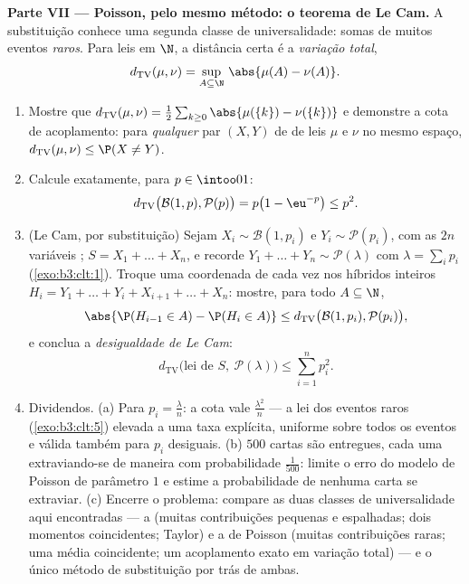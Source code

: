\begin{problem}
\medskip
\noindent\textbf{Parte VII --- Poisson, pelo mesmo método: o teorema de
Le Cam.} A substituição conhece uma segunda classe de universalidade:
somas de muitos eventos  \emph{raros}. Para leis em
$\N$, a distância certa é a \emph{variação total},
\[
d_{\mathrm{TV}}(\mu, \nu) = \sup_{A\subseteq\N}\,
\abs{\mu(A) - \nu(A)} .
\]
\begin{enumerate}[resume]
  \item Mostre que $d_{\mathrm{TV}}(\mu, \nu) =
        \frac12\sum_{k\geq0}\abs{\mu(\{k\}) -
        \nu(\{k\})}$ e demonstre a cota de acoplamento: para
        \emph{qualquer} par $(X, Y)$ de  de leis
        $\mu$ e $\nu$ no mesmo espaço, $d_{\mathrm{TV}}(\mu, \nu) \leq \P(X \neq Y)$.
  \item Calcule exatamente, para $p \in \intoo01$:
        \[
        d_{\mathrm{TV}}\bigl(\mathcal B(1, p), \mathcal
        P(p)\bigr) = p\bigl(1 - \eu^{-p}\bigr) \leq p^2 .
        \]
  \item (Le Cam, por substituição) Sejam $X_i \sim \mathcal B(1,
        p_i)$ e $Y_i \sim \mathcal P(p_i)$, com as $2n$
        variáveis ; $S = X_1 + \dots + X_n$, e recorde $Y_1 + \dots + Y_n \sim \mathcal P(\lambda)$ com $\lambda = \sum_ip_i$
        (\cref{exo:b3:clt:1}). Troque uma coordenada de cada vez nos híbridos
        inteiros $H_i = Y_1 + \dots + Y_i + X_{i+1} + \dots
        + X_n$: mostre, para todo $A \subseteq \N$,
        \[
        \abs{\P(H_{i-1} \in A) - \P(H_i \in A)} \leq
        d_{\mathrm{TV}}\bigl(\mathcal B(1, p_i), \mathcal
        P(p_i)\bigr),
        \]
        e conclua a \emph{desigualdade de Le Cam}:
        \[
        d_{\mathrm{TV}}\bigl(\text{lei de } S,\ \mathcal
        P(\lambda)\bigr) \leq \sum_{i=1}^np_i^2 .
        \]
  \item Dividendos. (a) Para $p_i = \frac\lambda n$: a cota vale $\frac{\lambda^2}n$ --- a lei dos
        eventos raros (\cref{exo:b3:clt:5}) elevada a uma taxa explícita,
        uniforme sobre todos os eventos e válida também para $p_i$
        desiguais. (b) $500$ cartas são entregues, cada uma
        extraviando-se de maneira  com probabilidade $\frac1{500}$:
        limite o erro do modelo de Poisson de parâmetro $1$ e estime
        a probabilidade de nenhuma carta se extraviar. (c) Encerre o
        problema: compare as duas classes de universalidade aqui
        encontradas --- a  (muitas contribuições pequenas e
        espalhadas; dois momentos coincidentes; Taylor) e a de Poisson
        (muitas contribuições raras; uma média coincidente; um
        acoplamento exato em variação total) --- e o único método de
        substituição por trás de ambas.


\end{enumerate}
\end{problem}
